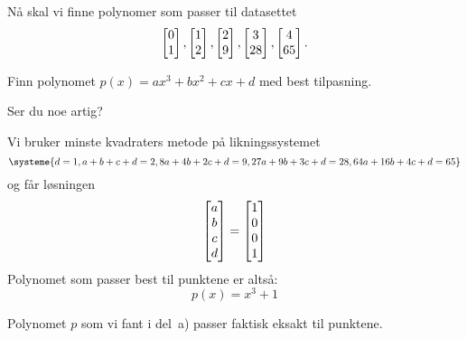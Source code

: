 



\begin{oppgave}
Nå skal vi finne polynomer som passer til datasettet 
$$\begin{bmatrix} 0 \\ 1 \end{bmatrix}, \begin{bmatrix} 1 \\ 2 \end{bmatrix}, \begin{bmatrix} 2 \\ 9 \end{bmatrix},\begin{bmatrix} 3 \\ 28 \end{bmatrix},\begin{bmatrix} 4 \\ 65 \end{bmatrix}.$$ 
\begin{punkt}
Finn polynomet $p(x)=ax^3+bx^2+cx+d$ med best tilpasning.
\end{punkt}

\begin{punkt}
Ser du noe artig?
\end{punkt}
\end{oppgave}


\begin{losning}
\begin{punkt}
Vi bruker minste kvadraters metode på likningssystemet
\[
\systeme{
d = 1,
a + b + c + d = 2,
8 a + 4 b + 2 c + d = 9,
27 a + 9 b + 3 c + d = 28,
64 a + 16 b + 4 c + d = 65
}
\]
og får løsningen
\[
\begin{bmatrix} a \\ b \\ c \\ d \end{bmatrix} = \begin{bmatrix} 1 \\ 0 \\ 0 \\ 1 \end{bmatrix}
\]
Polynomet som passer best til punktene er altså:
\[
p(x) = x^3 + 1
\]
\end{punkt}

\begin{punkt}
Polynomet $p$ som vi fant i del~a) passer faktisk eksakt til punktene.
\end{punkt}
\end{losning}





